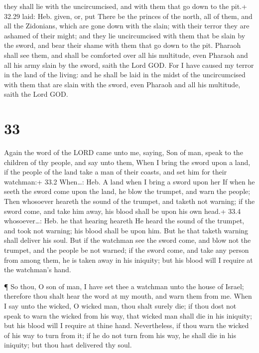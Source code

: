 they shall lie with the uncircumcised, and with them that go down to the
pit.+ 32.29 laid: Heb. given, or, put  There be the princes
of the north, all of them, and all the Zidonians, which are gone down
with the slain; with their terror they are ashamed of their might; and
they lie uncircumcised with them that be slain by the sword, and bear
their shame with them that go down to the pit.  Pharaoh
shall see them, and shall be comforted over all his multitude, even
Pharaoh and all his army slain by the sword, saith the Lord GOD.
 For I have caused my terror in the land of the living: and
he shall be laid in the midst of the uncircumcised with them that are
slain with the sword, even Pharaoh and all his multitude, saith the Lord
GOD.

\hypertarget{section-32}{%
\section{33}\label{section-32}}

 Again the word of the LORD came unto me, saying,
 Son of man, speak to the children of thy people, and say
unto them, When I bring the sword upon a land, if the people of the land
take a man of their coasts, and set him for their watchman:+ 33.2
When\ldots: Heb. A land when I bring a sword upon her  If
when he seeth the sword come upon the land, he blow the trumpet, and
warn the people;  Then whosoever heareth the sound of the
trumpet, and taketh not warning; if the sword come, and take him away,
his blood shall be upon his own head.+ 33.4 whosoever\ldots: Heb. he
that hearing heareth  He heard the sound of the trumpet, and
took not warning; his blood shall be upon him. But he that taketh
warning shall deliver his soul.  But if the watchman see the
sword come, and blow not the trumpet, and the people be not warned; if
the sword come, and take any person from among them, he is taken away in
his iniquity; but his blood will I require at the watchman's hand.

 ¶ So thou, O son of man, I have set thee a watchman unto
the house of Israel; therefore thou shalt hear the word at my mouth, and
warn them from me.  When I say unto the wicked, O wicked
man, thou shalt surely die; if thou dost not speak to warn the wicked
from his way, that wicked man shall die in his iniquity; but his blood
will I require at thine hand.  Nevertheless, if thou warn
the wicked of his way to turn from it; if he do not turn from his way,
he shall die in his iniquity; but thou hast delivered thy soul.

